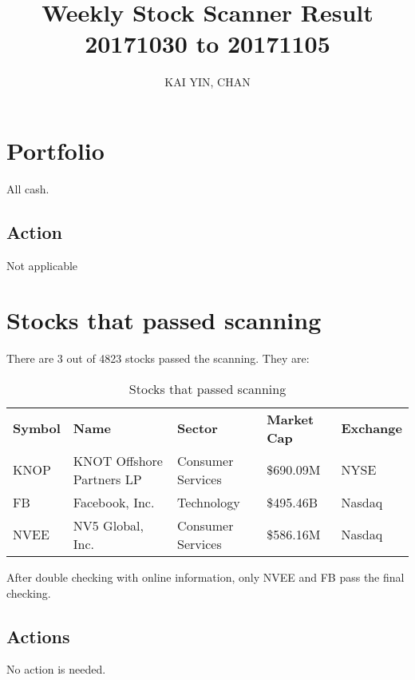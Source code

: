 \documentclass{article}
\begin{document}
\title{Weekly Stock Scanner Result \\ 20171030 to 20171105}
\author{KAI YIN, CHAN}
\maketitle

\section{Portfolio}
All cash.

\subsection{Action}
Not applicable

\section{Stocks that passed scanning}

There are 3 out of 4823 stocks passed the scanning.  They are:
\begin{table}[htbp]
  \caption{Stocks that passed scanning}
    \begin{tabular}{lllll}
    \textbf{Symbol} & \textbf{Name} & \textbf{Sector} & \textbf{Market Cap} & \textbf{Exchange} \\
    KNOP  & KNOT Offshore Partners LP & Consumer Services & \$690.09M & NYSE \\
    FB    & Facebook, Inc. & Technology & \$495.46B & Nasdaq \\
    NVEE  & NV5 Global, Inc. & Consumer Services & \$586.16M & Nasdaq \\
    \end{tabular}%
  \label{tab:addlabel}%
\end{table}%

After double checking with online information, only NVEE and FB pass the final checking.

\subsection{Actions}
No action is needed. 
\end{document}
